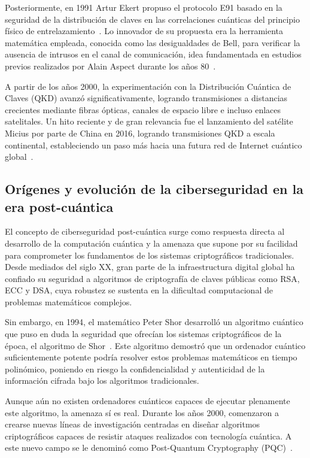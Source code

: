 Posteriormente, en 1991 Artur Ekert propuso el protocolo E91 basado en la
seguridad de la distribución de claves en las correlaciones cuánticas del
principio físico de entrelazamiento~\cite{Ekert1991}. Lo innovador de su propuesta era la herramienta matemática empleada, conocida como las desigualdades de Bell, para verificar la ausencia de intrusos en el canal de comunicación, idea fundamentada en estudios previos realizados por Alain Aspect durante los años 80~\cite{Aspect1982}.

A partir de los años 2000, la experimentación con la Distribución Cuántica
de Claves (QKD) avanzó significativamente, logrando transmisiones a distancias
crecientes mediante fibras ópticas, canales de espacio libre e incluso enlaces
satelitales. Un hito reciente y de gran relevancia fue el lanzamiento del
satélite Micius por parte de China en 2016, logrando transmisiones QKD a escala
continental, estableciendo un paso más hacia una futura red de Internet
cuántico global~\cite{Yin2017}.

\subsection{Orígenes y evolución de la ciberseguridad en la era post-cuántica}
El concepto de ciberseguridad post-cuántica surge como respuesta directa al
desarrollo de la computación cuántica y la amenaza que supone por su facilidad
para comprometer los fundamentos de los sistemas criptográficos tradicionales.
Desde mediados del siglo XX, gran parte de la infraestructura digital global ha
confiado su seguridad a algoritmos de criptografía de claves públicas como RSA,
ECC y DSA, cuya robustez se sustenta en la dificultad computacional de problemas
matemáticos complejos.

Sin embargo, en 1994, el matemático Peter Shor desarrolló un algoritmo cuántico
que puso en duda la seguridad que ofrecían los sistemas criptográficos de la
época, el algoritmo de Shor~\cite{Shor1997}. Este algoritmo demostró que un ordenador cuántico
suficientemente potente podría resolver estos problemas matemáticos en tiempo
polinómico, poniendo en riesgo la confidencialidad y autenticidad de la
información cifrada bajo los algoritmos tradicionales.

Aunque aún no existen ordenadores cuánticos capaces de ejecutar plenamente
este algoritmo, la amenaza sí es real. Durante los años 2000, comenzaron a
crearse nuevas líneas de investigación
centradas en diseñar algoritmos criptográficos capaces de resistir ataques realizados
con tecnología cuántica. A este nuevo campo se le denominó como Post-Quantum Cryptography
(PQC)~\cite{NIST_WhatIsPQC}.

